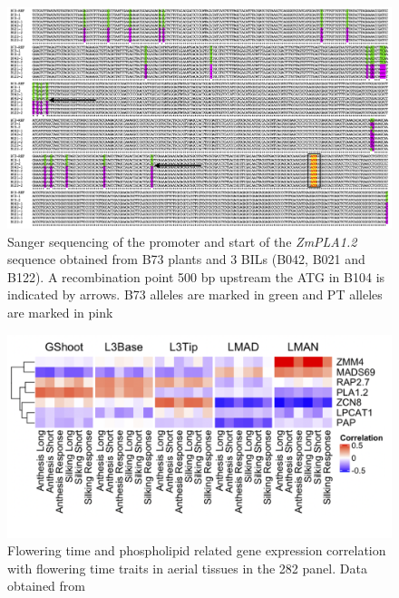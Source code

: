 \documentclass[9pt,twocolumn,twoside]{BioRxiv}
\begin{document}
\begin{figure}[t]
\begin{center}
\includegraphics[width=0.8\paperwidth]{Sup_Figures/Sup_Fig_6.png}
\caption{Sanger sequencing of the promoter and start of the \textit{ZmPLA1.2} sequence obtained from B73 plants and 3 BILs (B042, B021 and B122). A recombination point 500 bp upstream the ATG in B104 is indicated by arrows. B73 alleles are marked in green and PT alleles are marked in pink}
\label{SupFig5}
\end{center}
\end{figure} 

\begin{figure}[t]
\begin{center}
\includegraphics[width=0.8\paperwidth]{Sup_Figures/Sup_Fig_7.png}
\caption{Flowering time and phospholipid related gene expression correlation with flowering time traits in aerial tissues in the 282 panel. 
Data obtained from \cite{Kremling2018-gn}
}
\label{SupFig7}
\end{center}
\end{figure} 
\end{document}
